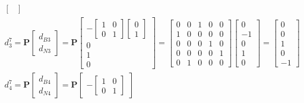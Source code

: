 \documentclass[11pt]{article}
\begin{document}
\begin{enumerate}
\begin{align*}
\begin{bmatrix}
      \end{bmatrix}
      \\
      d_3^7 = \textbf{P}
      \begin{bmatrix}
         d_{B3} \\ d_{N3}
      \end{bmatrix}
      =
      \textbf{P}
      \begin{bmatrix}
        -
        \begin{bmatrix}
         1 & 0 \\ 0 & 1   
        \end{bmatrix}
        \begin{bmatrix}
            0 \\ 1
        \end{bmatrix} \\
        0 \\ 1 \\ 0
      \end{bmatrix}
      = 
      \begin{bmatrix}
        0 & 0 & 1 & 0 & 0 \\
        1 & 0 & 0 & 0 & 0 \\
        0 & 0 & 0 & 1 & 0 \\
        0 & 0 & 0 & 0 & 1 \\
        0 & 1 & 0 & 0 & 0
      \end{bmatrix}
      \begin{bmatrix}
        0 \\ -1 \\ 0 \\ 1 \\ 0
      \end{bmatrix}
      =
      \begin{bmatrix}
        0 \\ 0 \\ 1 \\ 0 \\ -1
      \end{bmatrix}
      \\
      d_4^7 = \textbf{P}
      \begin{bmatrix}
         d_{B4} \\ d_{N4}
      \end{bmatrix}
      =
      \textbf{P}
      \begin{bmatrix}
        -
        \begin{bmatrix}
         1 & 0 \\ 0 & 1   
        \end{bmatrix}

\end{bmatrix}
\end{align*}
\end{enumerate}
\end{document}
